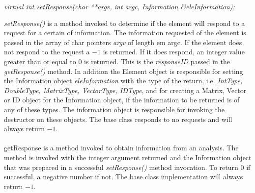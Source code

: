 $$

$$



{\em virtual int setResponse(char **argv, int argc, Information \&eleInformation);}

{\em setResponse()} is a method invoked to determine if the element
will respond to a request for a certain of information. The
information requested of the element is passed in the array of char
pointers {\em argv} of length {em argc}. If the element does not
respond to the request a $-1$ is returned. If it does respond, an
integer value greater than or equal to $0$ is returned. This is the
{\em responseID} passed in the {\em getResponse()} method. In addition
the Element object is responsible for setting the Information object
{\em eleInformation} with the type of the return, i.e. {\em IntType,
DoubleType, MatrixType, VectorType, IDType}, and for creating a Matrix,
Vector or ID object for the Information object, if the information to
be returned is of any of these types. The information object is
responsible for invoking the destructor on these objects. The base
class responds to no requests and will always return $-1$. \\

\\ 
getResponse is a method invoked to obtain information from an
analysis. The method is invoked with the integer argument returned and
the Information object that was prepared in a successful {\em
setResponse()} method invocation. To return $0$ if successful, a
negative number if not. The base class implementation will always
return $-1$. 

